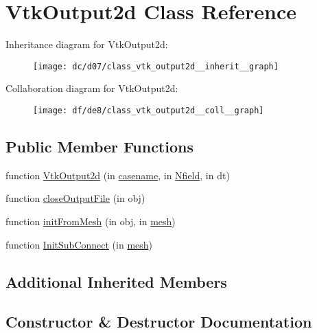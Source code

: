 \hypertarget{class_vtk_output2d}{}\section{Vtk\+Output2d Class Reference}
\label{class_vtk_output2d}


Inheritance diagram for Vtk\+Output2d\+:
\nopagebreak
\begin{figure}[H]
\begin{center}
\leavevmode
\texttt{[image: dc/d07/class\_vtk\_output2d\_\_inherit\_\_graph]}
\end{center}
\end{figure}


Collaboration diagram for Vtk\+Output2d\+:
\nopagebreak
\begin{figure}[H]
\begin{center}
\leavevmode
\texttt{[image: df/de8/class\_vtk\_output2d\_\_coll\_\_graph]}
\end{center}
\end{figure}
\subsection*{Public Member Functions}
\begin{DoxyCompactItemize}
\item 
function \hyperlink{class_vtk_output2d_a88e77e3dceb46e7299869a68147f9fa9}{Vtk\+Output2d} (in \hyperlink{class_abstract_output_file_a84df82b3a07c6e5eb1f92f21a74fa1e4}{casename}, in \hyperlink{class_abstract_output_file_afdf632429d019dff27d7f29102512101}{Nfield}, in dt)
\item 
function \hyperlink{class_vtk_output2d_a7b33dccaafe7cdde8d21eff7d13ebcac}{close\+Output\+File} (in obj)
\item 
function \hyperlink{class_vtk_output2d_a0f0e8a812e0abea162f662e38e94332d}{init\+From\+Mesh} (in obj, in \hyperlink{class_abstract_output_file_a499c10c99f2eece91673bc8b8d1d1e99}{mesh})
\item 
function \hyperlink{class_vtk_output2d_aaaad83dc62f578e2be39a86fa30859cd}{Init\+Sub\+Connect} (in \hyperlink{class_abstract_output_file_a499c10c99f2eece91673bc8b8d1d1e99}{mesh})
\end{DoxyCompactItemize}
\subsection*{Additional Inherited Members}


\subsection{Constructor \& Destructor Documentation}
\mbox{\label{class_vtk_output2d_a88e77e3dceb46e7299869a68147f9fa9}} 
